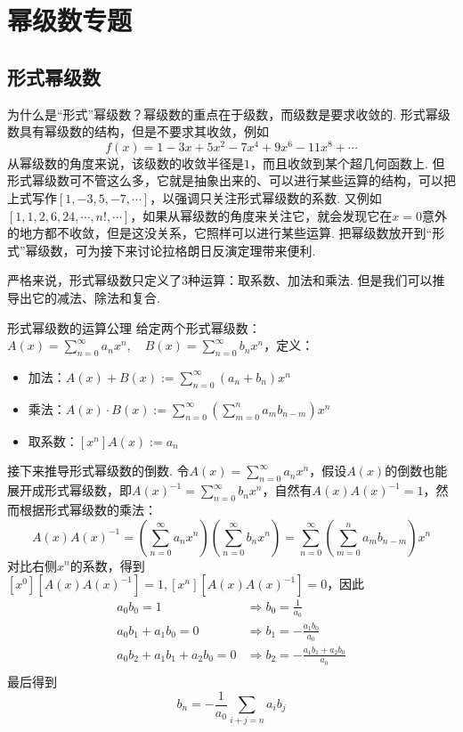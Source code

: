 
\section{幂级数专题}

\subsection{形式幂级数}

为什么是“形式”幂级数？幂级数的重点在于级数，而级数是要求收敛的. 形式幂级数具有幂级数的结构，但是不要求其收敛，例如
\[f(x) = 1-3x+5x^2-7x^4+9x^6-11x^8+\cdots\]
从幂级数的角度来说，该级数的收敛半径是\(1\)，而且收敛到某个超几何函数上. 但形式幂级数可不管这么多，它就是抽象出来的、可以进行某些运算的结构，可以把上式写作\([1,-3,5,-7,\cdots]\)，以强调只关注形式幂级数的系数. 又例如\([1,1,2,6,24, \cdots, n!, \cdots]\)，如果从幂级数的角度来关注它，就会发现它在\(x=0\)意外的地方都不收敛，但是这没关系，它照样可以进行某些运算. 把幂级数放开到“形式”幂级数，可为接下来讨论拉格朗日反演定理带来便利.

严格来说，形式幂级数只定义了3种运算：取系数、加法和乘法. 但是我们可以推导出它的减法、除法和复合.
\begin{definition}{形式幂级数的运算公理}
    给定两个形式幂级数：\(\displaystyle{A(x)=\sum_{n=0}^{\infty}a_nx^n, \quad B(x)=\sum_{n=0}^{\infty}b_nx^n}\)，定义：
    \begin{itemize}
        \item [] 加法：\(\displaystyle{A(x)+B(x) := \sum_{n=0}^{\infty}(a_n+b_n)x^n}\)
        \item [] 乘法：\(\displaystyle{A(x) \cdot B(x) := \sum_{n=0}^{\infty}\left(\sum_{m=0}^{n}a_mb_{n-m}\right)x^n}\)
        \item [] 取系数：\(\displaystyle{[x^n]A(x) := a_n}\)
    \end{itemize}
\end{definition}

接下来推导形式幂级数的倒数. 令\(\displaystyle{A(x) = \sum_{n=0}^{\infty}a_nx^n}\)，假设\(A(x)\)的倒数也能展开成形式幂级数，即\(\displaystyle{A(x)^{-1}= \sum_{n=0}^{\infty}b_nx^n}\)，自然有\(A(x)A(x)^{-1}=1\)，然而根据形式幂级数的乘法：
\[A(x)A(x)^{-1} = \left(\sum_{n=0}^{\infty}a_nx^n\right)\left(\sum_{n=0}^{\infty}b_nx^n\right) = \sum_{n=0}^{\infty}\left(\sum_{m=0}^{n}a_mb_{n-m}\right)x^n\]
对比右侧\(x^n\)的系数，得到\([x^0]\left[A(x)A(x)^{-1}\right]=1, [x^n]\left[A(x)A(x)^{-1}\right]=0\)，因此
\begin{align*}
    a_0b_0=1 & \Longrightarrow b_0=\frac{1}{a_0} \\
    a_0b_1+a_1b_0=0 & \Longrightarrow b_1=-\frac{a_1b_0}{a_0} \\
    a_0b_2+a_1b_1+a_2b_0=0 & \Longrightarrow b_2=-\frac{a_1b_1+a_2b_0}{a_0} \\
\end{align*}
最后得到
\[b_n = -\frac{1}{a_0}\sum_{i+j=n}a_ib_j\]


